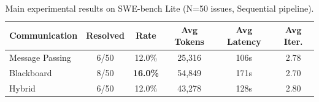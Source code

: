 \begin{table}[t]
\centering
\caption{Main experimental results on SWE-bench Lite (N=50 issues, Sequential pipeline).}
\label{tab:main-results}
\begin{tabular}{lccccc}
\toprule
\textbf{Communication} & \textbf{Resolved} & \textbf{Rate} & \textbf{Avg Tokens} & \textbf{Avg Latency} & \textbf{Avg Iter.} \\
\midrule
Message Passing & 6/50 & 12.0\% & 25,316 & 106s & 2.78 \\
Blackboard      & 8/50 & \textbf{16.0\%} & 54,849 & 171s & 2.70 \\
Hybrid          & 6/50 & 12.0\% & 43,278 & 128s & 2.80 \\
\bottomrule
\end{tabular}
\end{table}
